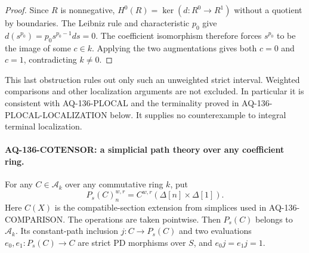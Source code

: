 \documentclass[11pt,a4paper]{article}
\theoremstyle{definition}\newtheorem{definition}[theorem]{Definition}
\theoremstyle{remark}\newtheorem{remark}[theorem]{Remark}
\begin{document}
\begin{proof}
Since $R$ is nonnegative, $H^0(R)=\ker(d:R^0\to R^1)$
without a quotient by boundaries.  The Leibniz rule and
characteristic $p_0$ give
$d(s^{p_0})=p_0s^{p_0-1}ds=0$.
The coefficient isomorphism therefore forces
$s^{p_0}$ to be the image of some $c\in k$.
Applying the two augmentations gives both $c=0$ and
$c=1$, contradicting $k\ne0$.
\end{proof}

This last obstruction rules out only such an unweighted
strict interval.  Weighted comparisons and other
localization arguments are not excluded.  In particular
it is consistent with AQ-136-PLOCAL and the terminality
proved in AQ-136-PLOCAL-LOCALIZATION below.  It supplies
no counterexample to integral terminal localization.


\paragraph{AQ-136-COTENSOR: a simplicial path theory over any coefficient ring.}
For any $C\in\mathcal A_k$ over any commutative ring $k$, put
\[
 P_s(C)_n^{w,r}=C^{w,r}(\Delta[n]\times\Delta[1]).             \tag{136.25}
\]
Here $C(X)$ is the compatible-section extension from simplices
used in AQ-136-COMPARISON.  The operations are taken pointwise.
Then $P_s(C)$ belongs to $\mathcal A_k$.  Its constant-path
inclusion $j:C\to P_s(C)$ and two evaluations
$e_0,e_1:P_s(C)\to C$ are strict PD morphisms over $S$,
and $e_0j=e_1j=1$.
\end{document}
